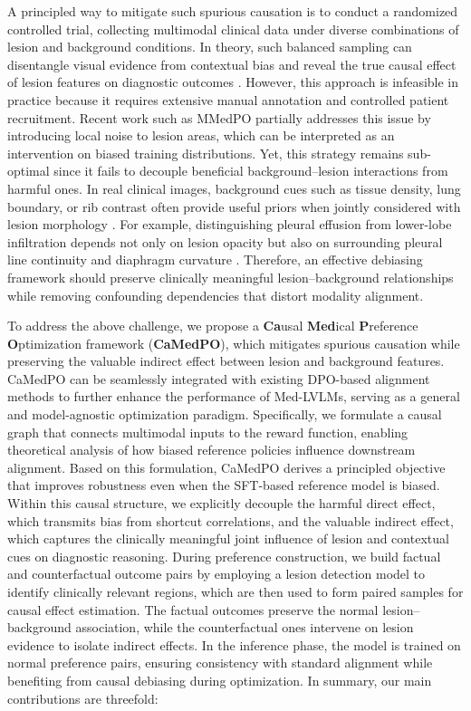 A principled way to mitigate such spurious causation is to conduct a randomized controlled trial, collecting multimodal clinical data under diverse combinations of lesion and background conditions. In theory, such balanced sampling can disentangle visual evidence from contextual bias and reveal the true causal effect of lesion features on diagnostic outcomes \cite{Thirunavukarasu2023LLMInMedicine}. However, this approach is infeasible in practice because it requires extensive manual annotation and controlled patient recruitment. Recent work such as MMedPO \cite{Zhu2025MMedPO} partially addresses this issue by introducing local noise to lesion areas, which can be interpreted as an intervention on biased training distributions. Yet, this strategy remains sub-optimal since it fails to decouple beneficial background–lesion interactions from harmful ones. In real clinical images, background cues such as tissue density, lung boundary, or rib contrast often provide useful priors when jointly considered with lesion morphology \cite{Royer2024MultiMedEval, Cui2023GPT4VHallucination}. For example, distinguishing pleural effusion from lower-lobe infiltration depends not only on lesion opacity but also on surrounding pleural line continuity and diaphragm curvature \cite{yamada2024pictorial}. Therefore, an effective debiasing framework should preserve clinically meaningful lesion–background relationships while removing confounding dependencies that distort modality alignment.

To address the above challenge, we propose a \textbf{Ca}usal \textbf{Med}ical \textbf{P}reference \textbf{O}ptimization framework (\textbf{CaMedPO}), which mitigates spurious causation while preserving the valuable indirect effect between lesion and background features. CaMedPO can be seamlessly integrated with existing DPO-based alignment methods to further enhance the performance of Med-LVLMs, serving as a general and model-agnostic optimization paradigm. Specifically, we formulate a causal graph that connects multimodal inputs to the reward function, enabling theoretical analysis of how biased reference policies influence downstream alignment. Based on this formulation, CaMedPO derives a principled objective that improves robustness even when the SFT-based reference model is biased. Within this causal structure, we explicitly decouple the harmful direct effect, which transmits bias from shortcut correlations, and the valuable indirect effect, which captures the clinically meaningful joint influence of lesion and contextual cues on diagnostic reasoning. During preference construction, we build factual and counterfactual outcome pairs by employing a lesion detection model to identify clinically relevant regions, which are then used to form paired samples for causal effect estimation. The factual outcomes preserve the normal lesion–background association, while the counterfactual ones intervene on lesion evidence to isolate indirect effects. In the inference phase, the model is trained on normal preference pairs, ensuring consistency with standard alignment while benefiting from causal debiasing during optimization. In summary, our main contributions are threefold:

